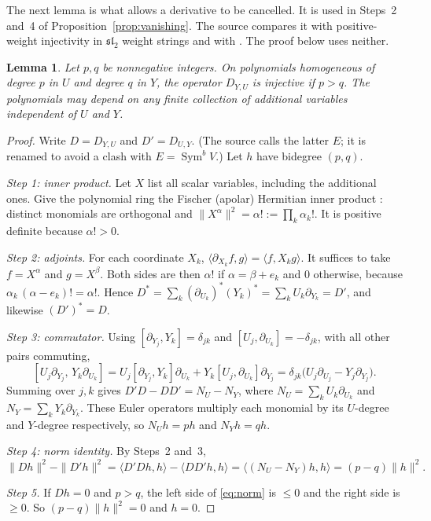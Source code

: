 \documentclass[11pt]{article}
\newtheorem{lemma}[theorem]{Lemma}
\theoremstyle{remark}
\DeclareMathOperator{\Sym}{Sym}
\newcommand{\D}[2]{D_{#1,#2}}
\begin{document}
The next lemma is what allows a derivative to be cancelled. It is used in
Steps~2 and~4 of Proposition~\ref{prop:vanishing}. The source compares it
with positive-weight injectivity in $\mathfrak{sl}_2$ weight strings
\cite[Section~11.1, Claim~11.4 and equation~(11.5)]{FultonHarris} and with
\cite[Section~5, Claim~5.1]{Ikenmeyer}. The proof below uses neither.

\begin{lemma}\label{lem:shift}
Let $p,q$ be nonnegative integers. On polynomials homogeneous of degree $p$
in $U$ and degree $q$ in $Y$, the operator $\D{Y}{U}$ is injective if
$p>q$. The polynomials may depend on any finite collection of additional
variables independent of $U$ and $Y$.
\end{lemma}

\begin{proof}
Write $D=\D{Y}{U}$ and $D'=\D{U}{Y}$. (The source calls the latter $E$; it is renamed
to avoid a clash with $E=\Sym^bV$.) Let $h$ have bidegree $(p,q)$.

\emph{Step 1: inner product.} Let $X$ list all scalar variables, including
the additional ones. Give the polynomial ring the Fischer (apolar)
Hermitian inner product
\cite[Section~2, equation~(8) and Proposition~3]{AldazRender}: distinct
monomials are orthogonal and $\|X^\alpha\|^2=\alpha!:=\prod_k\alpha_k!$.
It is positive definite because $\alpha!>0$.

\emph{Step 2: adjoints.} For each coordinate $X_k$,
$\langle\partial_{X_k}f,g\rangle=\langle f,X_kg\rangle$. It suffices to
take $f=X^\alpha$ and $g=X^\beta$. Both sides are then $\alpha!$ if
$\alpha=\beta+e_k$ and $0$ otherwise, because
$\alpha_k\,(\alpha-e_k)!=\alpha!$. Hence
$D^*=\sum_k(\partial_{U_k})^*(Y_k)^*=\sum_kU_k\partial_{Y_k}=D'$, and
likewise $(D')^*=D$.

\emph{Step 3: commutator.} Using $[\partial_{Y_j},Y_k]=\delta_{jk}$ and
$[U_j,\partial_{U_k}]=-\delta_{jk}$, with all other pairs commuting,
\[
 [U_j\partial_{Y_j},\,Y_k\partial_{U_k}]
 =U_j[\partial_{Y_j},Y_k]\partial_{U_k}+Y_k[U_j,\partial_{U_k}]\partial_{Y_j}
 =\delta_{jk}\bigl(U_j\partial_{U_j}-Y_j\partial_{Y_j}\bigr).
\]
Summing over $j,k$ gives $D'D-DD'=N_U-N_Y$, where
$N_U=\sum_kU_k\partial_{U_k}$ and $N_Y=\sum_kY_k\partial_{Y_k}$. These
Euler operators multiply each monomial by its $U$-degree and $Y$-degree
respectively, so $N_Uh=ph$ and $N_Yh=qh$.

\emph{Step 4: norm identity.} By Steps~2 and~3,
\begin{equation}\label{eq:norm}
 \|Dh\|^2-\|D'h\|^2
 =\langle D'Dh,h\rangle-\langle DD'h,h\rangle
 =\langle(N_U-N_Y)h,h\rangle=(p-q)\|h\|^2.
\end{equation}

\emph{Step 5.} If $Dh=0$ and $p>q$, the left side of \eqref{eq:norm} is
$\le0$ and the right side is $\ge0$. So $(p-q)\|h\|^2=0$ and $h=0$.
\end{proof}
\end{document}
